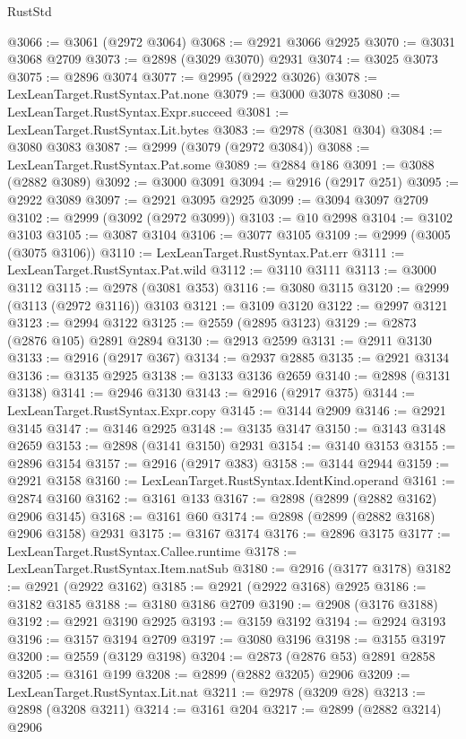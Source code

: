 \begin{lexlean}{RustStd}
\begin{coremodule}
@3066 := @3061 (@2972 @3064)
@3068 := @2921 @3066 @2925
@3070 := @3031 @3068 @2709
@3073 := @2898 (@3029 @3070) @2931
@3074 := @3025 @3073
@3075 := @2896 @3074
@3077 := @2995 (@2922 @3026)
@3078 := LexLeanTarget.RustSyntax.Pat.none
@3079 := @3000 @3078
@3080 := LexLeanTarget.RustSyntax.Expr.succeed
@3081 := LexLeanTarget.RustSyntax.Lit.bytes
@3083 := @2978 (@3081 @304)
@3084 := @3080 @3083
@3087 := @2999 (@3079 (@2972 @3084))
@3088 := LexLeanTarget.RustSyntax.Pat.some
@3089 := @2884 @186
@3091 := @3088 (@2882 @3089)
@3092 := @3000 @3091
@3094 := @2916 (@2917 @251)
@3095 := @2922 @3089
@3097 := @2921 @3095 @2925
@3099 := @3094 @3097 @2709
@3102 := @2999 (@3092 (@2972 @3099))
@3103 := @10 @2998
@3104 := @3102 @3103
@3105 := @3087 @3104
@3106 := @3077 @3105
@3109 := @2999 (@3005 (@3075 @3106))
@3110 := LexLeanTarget.RustSyntax.Pat.err
@3111 := LexLeanTarget.RustSyntax.Pat.wild
@3112 := @3110 @3111
@3113 := @3000 @3112
@3115 := @2978 (@3081 @353)
@3116 := @3080 @3115
@3120 := @2999 (@3113 (@2972 @3116)) @3103
@3121 := @3109 @3120
@3122 := @2997 @3121
@3123 := @2994 @3122
@3125 := @2559 (@2895 @3123)
@3129 := @2873 (@2876 @105) @2891 @2894
@3130 := @2913 @2599
@3131 := @2911 @3130
@3133 := @2916 (@2917 @367)
@3134 := @2937 @2885
@3135 := @2921 @3134
@3136 := @3135 @2925
@3138 := @3133 @3136 @2659
@3140 := @2898 (@3131 @3138)
@3141 := @2946 @3130
@3143 := @2916 (@2917 @375)
@3144 := LexLeanTarget.RustSyntax.Expr.copy
@3145 := @3144 @2909
@3146 := @2921 @3145
@3147 := @3146 @2925
@3148 := @3135 @3147
@3150 := @3143 @3148 @2659
@3153 := @2898 (@3141 @3150) @2931
@3154 := @3140 @3153
@3155 := @2896 @3154
@3157 := @2916 (@2917 @383)
@3158 := @3144 @2944
@3159 := @2921 @3158
@3160 := LexLeanTarget.RustSyntax.IdentKind.operand
@3161 := @2874 @3160
@3162 := @3161 @133
@3167 := @2898 (@2899 (@2882 @3162) @2906 @3145)
@3168 := @3161 @60
@3174 := @2898 (@2899 (@2882 @3168) @2906 @3158) @2931
@3175 := @3167 @3174
@3176 := @2896 @3175
@3177 := LexLeanTarget.RustSyntax.Callee.runtime
@3178 := LexLeanTarget.RustSyntax.Item.natSub
@3180 := @2916 (@3177 @3178)
@3182 := @2921 (@2922 @3162)
@3185 := @2921 (@2922 @3168) @2925
@3186 := @3182 @3185
@3188 := @3180 @3186 @2709
@3190 := @2908 (@3176 @3188)
@3192 := @2921 @3190 @2925
@3193 := @3159 @3192
@3194 := @2924 @3193
@3196 := @3157 @3194 @2709
@3197 := @3080 @3196
@3198 := @3155 @3197
@3200 := @2559 (@3129 @3198)
@3204 := @2873 (@2876 @53) @2891 @2858
@3205 := @3161 @199
@3208 := @2899 (@2882 @3205) @2906
@3209 := LexLeanTarget.RustSyntax.Lit.nat
@3211 := @2978 (@3209 @28)
@3213 := @2898 (@3208 @3211)
@3214 := @3161 @204
@3217 := @2899 (@2882 @3214) @2906

\end{coremodule}
\end{lexlean}
